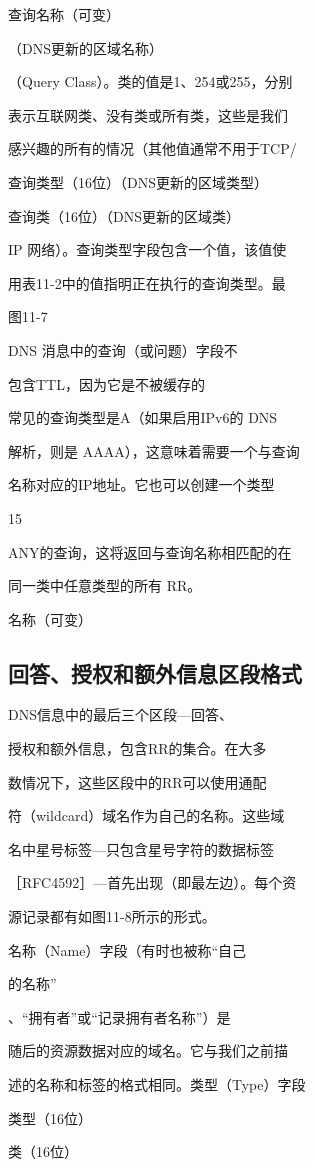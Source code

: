 查询名称（可变）

（DNS更新的区域名称）

（Query Class）。类的值是1、254或255，分别

表示互联网类、没有类或所有类，这些是我们

感兴趣的所有的情况（其他值通常不用于TCP/

查询类型（16位）（DNS更新的区域类型）

查询类（16位）（DNS更新的区域类）

IP 网络）。查询类型字段包含一个值，该值使

用表11-2中的值指明正在执行的查询类型。最

图11-7

DNS 消息中的查询（或问题）字段不

包含TTL，因为它是不被缓存的

常见的查询类型是A（如果启用IPv6的 DNS

解析，则是 AAAA），这意味着需要一个与查询

名称对应的IP地址。它也可以创建一个类型

15

ANY的查询，这将返回与查询名称相匹配的在

同一类中任意类型的所有 RR。

名称（可变）

\subsection{回答、授权和额外信息区段格式}

DNS信息中的最后三个区段—回答、

授权和额外信息，包含RR的集合。在大多

数情况下，这些区段中的RR可以使用通配

符（wildcard）域名作为自己的名称。这些域

名中星号标签—只包含星号字符的数据标签

［RFC4592］—首先出现（即最左边）。每个资

源记录都有如图11-8所示的形式。

名称（Name）字段（有时也被称“自己

的名称”

、“拥有者”或“记录拥有者名称”）是

随后的资源数据对应的域名。它与我们之前描

述的名称和标签的格式相同。类型（Type）字段

类型（16位）

类（16位）


